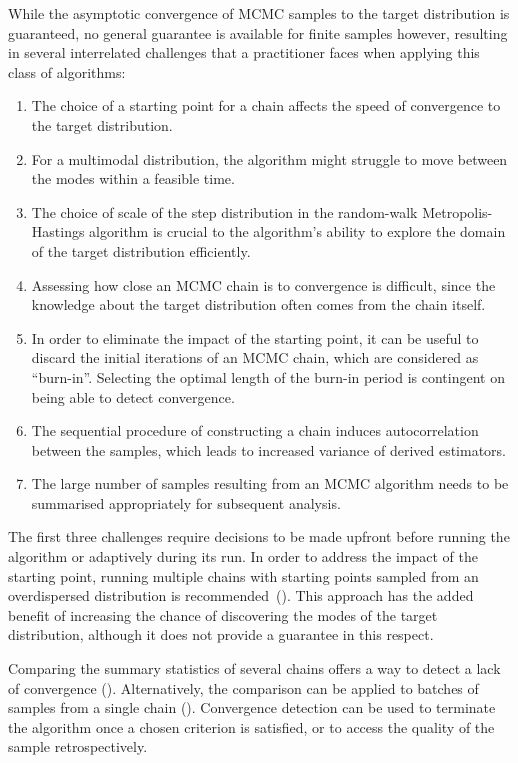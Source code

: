 \documentclass[12pt,a4paper]{report}
\begin{document}
While the asymptotic convergence of MCMC samples to the target distribution is guaranteed, no general guarantee is available for finite samples however, resulting in several interrelated challenges that a practitioner faces when applying this class of algorithms:
\begin{enumerate}
\item The choice of a starting point for a chain affects the speed of convergence to the target distribution.
\item For a multimodal distribution, the algorithm might struggle to move between the modes within a feasible time.
\item The choice of scale of the step distribution in the random-walk Metropolis-Hastings algorithm is crucial to the algorithm's ability to explore the domain of the target distribution efficiently.
\item Assessing how close an MCMC chain is to convergence is difficult, since the knowledge about the target distribution often comes from the chain itself.
\item In order to eliminate the impact of the starting point, it can be useful to discard the initial iterations of an MCMC chain, which are considered as ``burn-in''. Selecting the optimal length of the burn-in period is contingent on being able to detect convergence.
\item The sequential procedure of constructing a chain induces autocorrelation between the samples, which leads to increased variance of derived estimators.
\item The large number of samples resulting from an MCMC algorithm needs to be summarised appropriately for subsequent analysis.
\end{enumerate}

The first three challenges require decisions to be made upfront before running the algorithm or adaptively during its run. In order to address the impact of the starting point, running multiple chains with starting points sampled from an overdispersed distribution is recommended~(\cite{gelman_inference_1992}). This approach has the added benefit of increasing the chance of discovering the modes of the target distribution, although it does not provide a guarantee in this respect. 

Comparing the summary statistics of several chains offers a way to detect a lack of convergence (\cite{gelman_inference_1992,brooks_general_1998,vehtari_rank_normalization_2021}). Alternatively, the comparison can be applied to batches of samples from a single chain (\cite{vats_revisiting_2021}). Convergence detection can be used to terminate the algorithm once a chosen criterion is satisfied, or to access the quality of the sample retrospectively.
\end{document}
